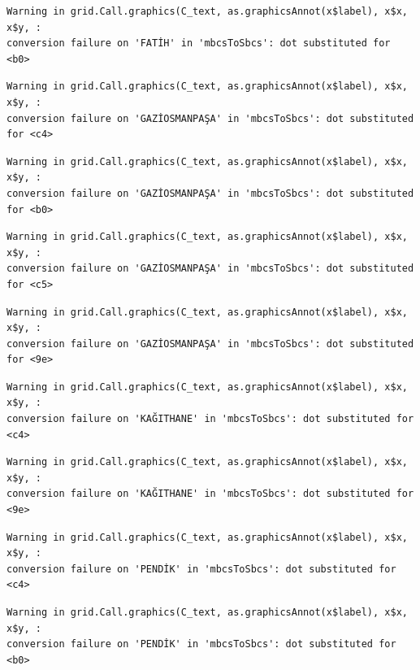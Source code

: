 \documentclass[
  11pt,
  a4paper,
  DIV=11,
  numbers=noendperiod]{scrartcl}
\begin{document}
\begin{verbatim}
Warning in grid.Call.graphics(C_text, as.graphicsAnnot(x$label), x$x, x$y, :
conversion failure on 'FATİH' in 'mbcsToSbcs': dot substituted for <b0>
\end{verbatim}

\begin{verbatim}
Warning in grid.Call.graphics(C_text, as.graphicsAnnot(x$label), x$x, x$y, :
conversion failure on 'GAZİOSMANPAŞA' in 'mbcsToSbcs': dot substituted for <c4>
\end{verbatim}

\begin{verbatim}
Warning in grid.Call.graphics(C_text, as.graphicsAnnot(x$label), x$x, x$y, :
conversion failure on 'GAZİOSMANPAŞA' in 'mbcsToSbcs': dot substituted for <b0>
\end{verbatim}

\begin{verbatim}
Warning in grid.Call.graphics(C_text, as.graphicsAnnot(x$label), x$x, x$y, :
conversion failure on 'GAZİOSMANPAŞA' in 'mbcsToSbcs': dot substituted for <c5>
\end{verbatim}

\begin{verbatim}
Warning in grid.Call.graphics(C_text, as.graphicsAnnot(x$label), x$x, x$y, :
conversion failure on 'GAZİOSMANPAŞA' in 'mbcsToSbcs': dot substituted for <9e>
\end{verbatim}

\begin{verbatim}
Warning in grid.Call.graphics(C_text, as.graphicsAnnot(x$label), x$x, x$y, :
conversion failure on 'KAĞITHANE' in 'mbcsToSbcs': dot substituted for <c4>
\end{verbatim}

\begin{verbatim}
Warning in grid.Call.graphics(C_text, as.graphicsAnnot(x$label), x$x, x$y, :
conversion failure on 'KAĞITHANE' in 'mbcsToSbcs': dot substituted for <9e>
\end{verbatim}

\begin{verbatim}
Warning in grid.Call.graphics(C_text, as.graphicsAnnot(x$label), x$x, x$y, :
conversion failure on 'PENDİK' in 'mbcsToSbcs': dot substituted for <c4>
\end{verbatim}

\begin{verbatim}
Warning in grid.Call.graphics(C_text, as.graphicsAnnot(x$label), x$x, x$y, :
conversion failure on 'PENDİK' in 'mbcsToSbcs': dot substituted for <b0>
\end{verbatim}
\end{document}
